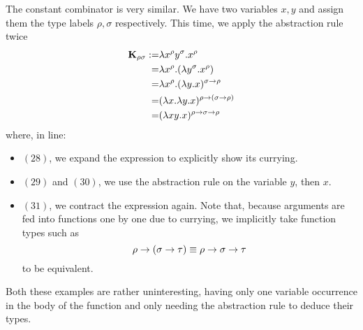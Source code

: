 The constant combinator is very similar. We have two variables $x, y$ and assign them the type labels $\rho, \sigma$ respectively. This time, we apply the abstraction rule twice
\begin{align}
    \textbf K_{\rho\sigma}:=&\lambda x^\rho y^\sigma.x^\rho
    \\=&\lambda x^\rho.(\lambda y^\sigma.x^\rho)
    \\=&\lambda x^\rho.(\lambda y.x)^{\sigma\rightarrow\rho}
    \\=&(\lambda x.\lambda y.x)^{\rho\rightarrow(\sigma\rightarrow\rho)}
    \\=&(\lambda xy.x)^{\rho\rightarrow\sigma\rightarrow\rho}
\end{align}
where, in line:
\begin{itemize}
    \item $(28)$, we expand the expression to explicitly show its currying.
    \item $(29)$ and $(30)$, we use the abstraction rule on the variable $y$, then $x$.
    \item $(31)$, we contract the expression again. Note that, because arguments are fed into functions one by one due to currying, we implicitly take function types such as
    \begin{equation}
        \rho\rightarrow(\sigma\rightarrow\tau)\equiv\rho\rightarrow\sigma\rightarrow\tau
    \end{equation}
    to be equivalent.
\end{itemize}
Both these examples are rather uninteresting, having only one variable occurrence in the body of the function and only needing the abstraction rule to deduce their types.

